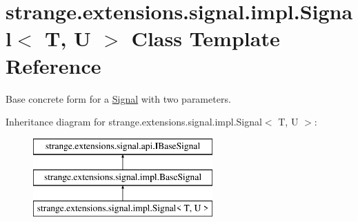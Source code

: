 \hypertarget{classstrange_1_1extensions_1_1signal_1_1impl_1_1_signal_3_01_t_00_01_u_01_4}{\section{strange.\-extensions.\-signal.\-impl.\-Signal$<$ T, U $>$ Class Template Reference}
\label{classstrange_1_1extensions_1_1signal_1_1impl_1_1_signal_3_01_t_00_01_u_01_4}
}


Base concrete form for a \hyperlink{classstrange_1_1extensions_1_1signal_1_1impl_1_1_signal}{Signal} with two parameters.  


Inheritance diagram for strange.\-extensions.\-signal.\-impl.\-Signal$<$ T, U $>$\-:\begin{figure}[H]
\begin{center}
\leavevmode
\includegraphics[height=3.000000cm]{classstrange_1_1extensions_1_1signal_1_1impl_1_1_signal_3_01_t_00_01_u_01_4}
\end{center}
\end{figure}
